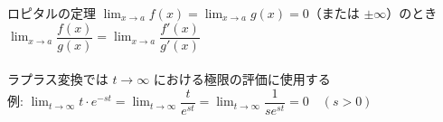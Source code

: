 \begin{frame}{ロピタルの定理}
  $\lim_{x\to a} f(x) = \lim_{x\to a} g(x) = 0$（または $\pm\infty$）のとき\\[2pt]
  $\lim_{x\to a} \dfrac{f(x)}{g(x)} = \lim_{x\to a} \dfrac{f'(x)}{g'(x)}$\\[2pt]
  \\[2pt]
  {\small ラプラス変換では $t \to \infty$ における極限の評価に使用する}\\[1pt]
  {\small 例: $\lim_{t\to\infty} t \cdot e^{-st} = \lim_{t\to\infty} \dfrac{t}{e^{st}} = \lim_{t\to\infty} \dfrac{1}{s e^{st}} = 0 \quad (s > 0)$}\\[1pt]
\end{frame}

